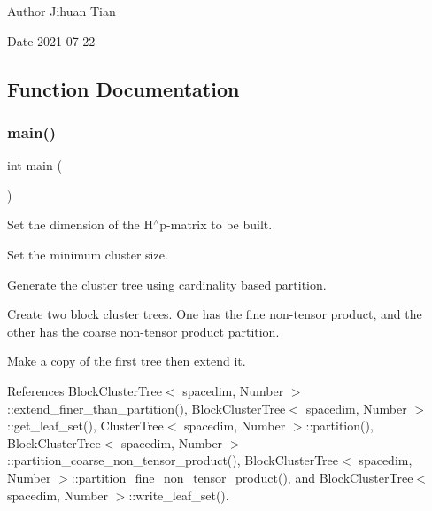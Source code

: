 \begin{DoxyAuthor}{Author}
Jihuan Tian 
\end{DoxyAuthor}
\begin{DoxyDate}{Date}
2021-\/07-\/22 
\end{DoxyDate}


\subsection{Function Documentation}
\mbox{\label{bct-extend-finer-than-partition_8cc_ae66f6b31b5ad750f1fe042a706a4e3d4}} 
\subsubsection{\texorpdfstring{main()}{main()}}
{\footnotesize\ttfamily int main (\begin{DoxyParamCaption}{ }\end{DoxyParamCaption})}

Set the dimension of the H$^\wedge$p-\/matrix to be built.

Set the minimum cluster size.

Generate the cluster tree using cardinality based partition.

Create two block cluster trees. One has the fine non-\/tensor product, and the other has the coarse non-\/tensor product partition.

Make a copy of the first tree then extend it.

References Block\+Cluster\+Tree$<$ spacedim, Number $>$\+::extend\+\_\+finer\+\_\+than\+\_\+partition(), Block\+Cluster\+Tree$<$ spacedim, Number $>$\+::get\+\_\+leaf\+\_\+set(), Cluster\+Tree$<$ spacedim, Number $>$\+::partition(), Block\+Cluster\+Tree$<$ spacedim, Number $>$\+::partition\+\_\+coarse\+\_\+non\+\_\+tensor\+\_\+product(), Block\+Cluster\+Tree$<$ spacedim, Number $>$\+::partition\+\_\+fine\+\_\+non\+\_\+tensor\+\_\+product(), and Block\+Cluster\+Tree$<$ spacedim, Number $>$\+::write\+\_\+leaf\+\_\+set().

